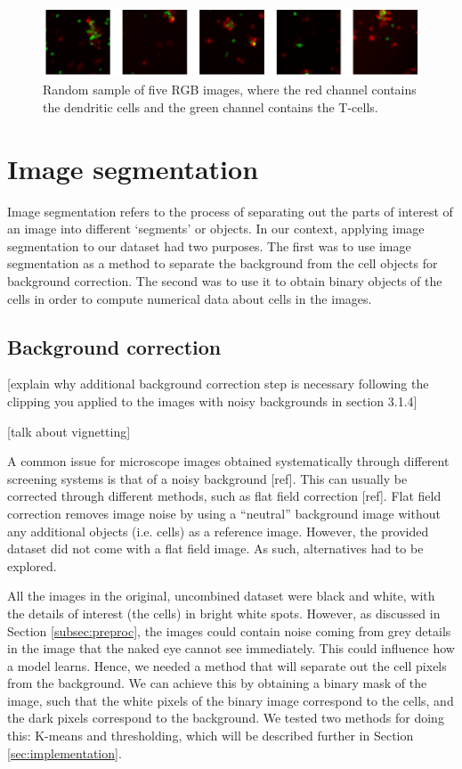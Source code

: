 \begin{figure}[h]
    \centering
    \includegraphics[width=\textwidth]{dissertation/figures/combined_cells.png}
    \caption{Random sample of five RGB images, where the red channel contains the dendritic cells and the green channel contains the T-cells.}
    \label{fig:combined}
\end{figure}

\section{Image segmentation}

Image segmentation refers to the process of separating out the parts of interest of an image into different `segments' or objects. In our context, applying image segmentation to our dataset had two purposes. The first was to use image segmentation as a method to separate the background from the cell objects for background correction. The second was to use it to obtain binary objects of the cells in order to compute numerical data about cells in the images.

\subsection{Background correction} \label{subsec:correction}

[explain why additional background correction step is necessary following the clipping you applied to the images with noisy backgrounds in section 3.1.4]

[talk about vignetting]

A common issue for microscope images obtained systematically through different screening systems is that of a noisy background [ref]. This can usually be corrected through different methods, such as flat field correction [ref]. Flat field correction removes image noise by using a ``neutral” background image without any additional objects (i.e. cells) as a reference image. However, the provided dataset did not come with a flat field image. As such, alternatives had to be explored.

All the images in the original, uncombined dataset were black and white, with the details of interest (the cells) in bright white spots. However, as discussed in Section \ref{subsec:preproc}, the images could contain noise coming from grey details in the image that the naked eye cannot see immediately. This could influence how a model learns. Hence, we needed a method that will separate out the cell pixels from the background. We can achieve this by obtaining a binary mask of the image, such that the white pixels of the binary image correspond to the cells, and the dark pixels correspond to the background. We tested two methods for doing this: K-means and thresholding, which will be described further in Section \ref{sec:implementation}.

